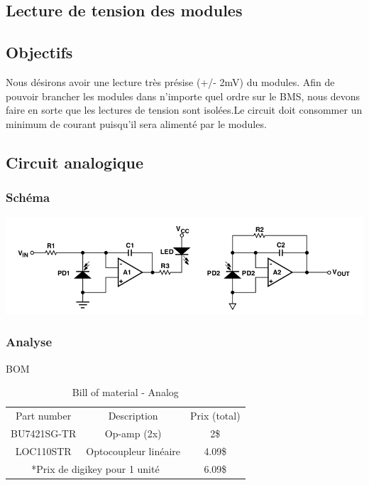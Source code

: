 \documentclass[12pt,letterpaper]{article}
\begin{document}
	\newpage
	\begin{normalsize}
		\section{Lecture de tension des modules}
			\subsection{Objectifs}
				Nous d\'{e}sirons avoir une lecture tr\`{e}s pr\'{e}sise (+/- 2mV) du modules. Afin de pouvoir brancher les modules dans n'importe quel ordre sur le BMS, nous devons faire en sorte que les lectures de tension sont isol\'{e}es.Le circuit doit consommer un minimum de courant puisqu'il sera aliment\'{e} par le modules.
			\subsection{Circuit analogique}
				\subsubsection{Sch\'{e}ma}
				\begin{center}
					\includegraphics[scale=0.5]{Analog} \\ \vspace{0cm}
				\end{center}
			
				\subsubsection{Analyse}
					\begin{table}[h!]	
						\centering
						BOM\\ \vspace{0.2cm}
						\begin{tabular}{|c|c|c|}
							\hline
							Part number & Description & Prix (total)\\ \hhline{|=|=|=|}
							BU7421SG-TR & Op-amp (2x) & 2\$ \\ \hline
							LOC110STR & Optocoupleur lin\'{e}aire & 4.09\$ \\ \hline
							 \multicolumn{2}{|c|}{*Prix de digikey pour 1 unit\'{e} }& 6.09\$ \\ \hline
						\end{tabular}
						\caption{Bill of material - Analog}
						\label{Table:1}
					\end{table}
						

\end{normalsize}
\end{document}
